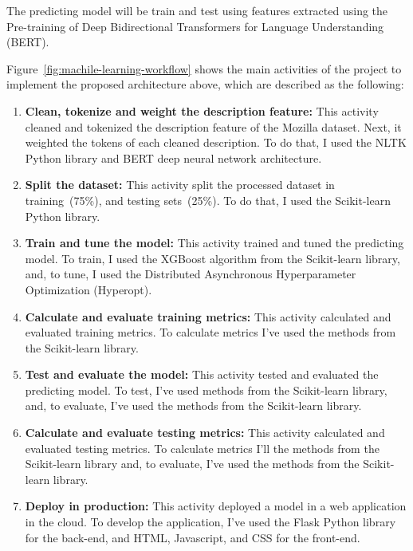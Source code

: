 \documentclass[a4paper]{article}
\begin{document}
The predicting model will be train and test using features extracted using the Pre-training of Deep Bidirectional Transformers for Language Understanding (BERT)\cite{devlin:2019}.

\bigskip
Figure~\ref{fig:machile-learning-workflow} shows the main activities of the project to implement the proposed architecture above, which are described as the following:

\begin{enumerate}
    \item {\bf Clean, tokenize and weight the description feature:} This activity cleaned and tokenized the description feature of the Mozilla dataset. Next, it weighted the tokens of each cleaned description. To do that, I used the NLTK Python library and BERT deep neural network architecture. 
    
    \item {\bf Split the dataset:} This activity split the processed dataset in training~(75\%), and testing sets~(25\%). To do that, I used the Scikit-learn Python library. 
    
    \item {\bf Train and tune the model:} This activity trained and tuned the predicting model. To train, I used the XGBoost algorithm from the Scikit-learn library, and, to tune, I used the Distributed Asynchronous Hyperparameter Optimization (Hyperopt).
    
    \item {\bf Calculate and evaluate training metrics:} This activity calculated and evaluated training metrics. To calculate metrics I've used the methods from the Scikit-learn library.
    
    \item {\bf Test and evaluate the model:} This activity tested and evaluated the predicting model. To test, I've used methods from the Scikit-learn library, and, to evaluate, I've used the methods from the Scikit-learn library.
    
    \item {\bf Calculate and evaluate testing metrics:} This activity calculated and evaluated testing metrics. To calculate metrics I'll the methods from the Scikit-learn library and, to evaluate, I've used the methods from the Scikit-learn library.
    
    \item {\bf Deploy in production:} This activity deployed a model in a web application in the cloud. To develop the application, I've used the Flask Python library for the back-end, and HTML, Javascript, and CSS for the front-end.
    
\end{enumerate}
\end{document}

